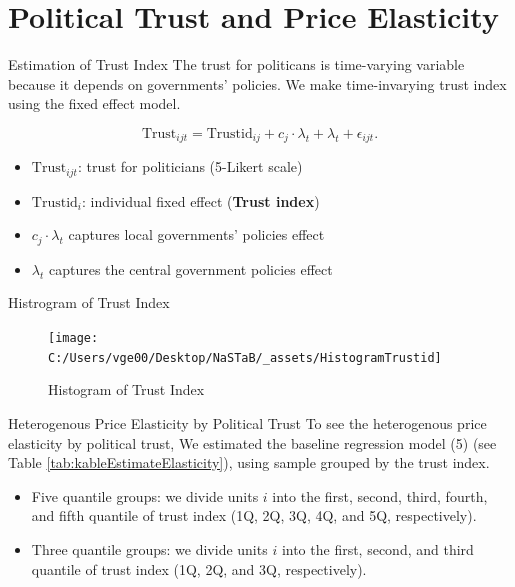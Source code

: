 \documentclass[
  ignorenonframetext,
]{beamer}
\providecommand{\tightlist}{%
  \setlength{\itemsep}{0pt}\setlength{\parskip}{0pt}}
\begin{document}
\hypertarget{political-trust-and-price-elasticity}{%
\section{Political Trust and Price
Elasticity}\label{political-trust-and-price-elasticity}}

\begin{frame}{Estimation of Trust Index}
\protect\hypertarget{estimation-of-trust-index}{}
The trust for politicans is time-varying variable because it depends on
governments' policies. We make time-invarying trust index using the
fixed effect model.

\[
    \text{Trust}_{ijt} = \text{Trustid}_{ij} + c_j \cdot \lambda_t + \lambda_t + \epsilon_{ijt}.
\]

\begin{itemize}
\tightlist
\item
  \(\text{Trust}_{ijt}\): trust for politicians (5-Likert scale)
\item
  \(\text{Trustid}_i\): individual fixed effect (\textbf{Trust index})
\item
  \(c_j \cdot \lambda_t\) captures local governments' policies effect
\item
  \(\lambda_t\) captures the central government policies effect
\end{itemize}
\end{frame}

\begin{frame}{Histrogram of Trust Index}
\protect\hypertarget{histrogram-of-trust-index}{}
\begin{figure}
\texttt{[image: C:/Users/vge00/Desktop/NaSTaB/\_assets/HistogramTrustid]} \caption{Histogram of Trust Index}\label{fig:unnamed-chunk-6}
\end{figure}
\end{frame}

\begin{frame}{Heterogenous Price Elasticity by Political Trust}
\protect\hypertarget{heterogenous-price-elasticity-by-political-trust}{}
To see the heterogenous price elasticity by political trust, We
estimated the baseline regression model (5) (see Table
\ref{tab:kableEstimateElasticity}), using sample grouped by the trust
index.

\begin{itemize}
\tightlist
\item
  Five quantile groups: we divide units \(i\) into the first, second,
  third, fourth, and fifth quantile of trust index (1Q, 2Q, 3Q, 4Q, and
  5Q, respectively).
\item
  Three quantile groups: we divide units \(i\) into the first, second,
  and third quantile of trust index (1Q, 2Q, and 3Q, respectively).
\end{itemize}
\end{frame}
\end{document}

